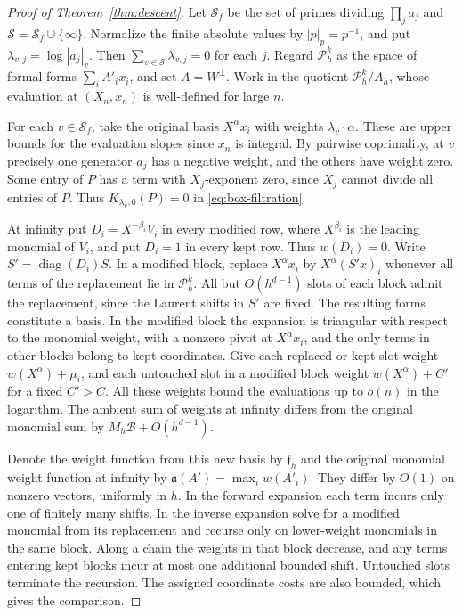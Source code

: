 \documentclass[11pt,a4paper,reqno]{amsart}
\theoremstyle{definition}
\theoremstyle{remark}
\numberwithin{equation}{section}
\begin{document}
\begin{proof}[Proof of Theorem~\ref{thm:descent}]
Let \(\mathcal S_f\) be the set of primes dividing \(\prod_j a_j\)
and \(\mathcal S=\mathcal S_f\cup\{\infty\}\). Normalize the finite
absolute values by \(|p|_p=p^{-1}\), and put
\(\lambda_{v,j}=\log|a_j|_v\). Then
\(\sum_{v\in\mathcal S}\lambda_{v,j}=0\) for each \(j\).
Regard \(\mathcal P_h^k\) as the space of formal forms
\(\sum_i A'_i x_i\), and set \(A=W^\perp\).
Work in the quotient \(\mathcal P_h^k/A_h\), whose evaluation
at \((X_n,x_n)\) is well-defined for large \(n\).

For each \(v\in\mathcal S_f\), take the original basis
\(X^\alpha x_i\) with weights \(\lambda_v\cdot\alpha\).
These are upper bounds for the evaluation slopes since \(x_n\)
is integral. By pairwise coprimality, at \(v\) precisely one generator
\(a_j\) has a negative weight, and the others have weight zero.
Some entry of \(P\) has a term with \(X_j\)-exponent zero,
since \(X_j\) cannot divide all entries of \(P\).
Thus \(K_{\lambda_v,0}(P)=0\) in \eqref{eq:box-filtration}.

At infinity put \(D_i=X^{-\beta_i}V_i\) in every modified row,
where \(X^{\beta_i}\) is the leading monomial of \(V_i\), and put
\(D_i=1\) in every kept row. Thus \(w(D_i)=0\).
Write \(S'=\operatorname{diag}(D_i)S\).
In a modified block, replace \(X^\alpha x_i\) by \(X^\alpha(S'x)_i\)
whenever all terms of the replacement lie in \(\mathcal P_h^k\).
All but \(O(h^{d-1})\) slots of each block admit the replacement,
since the Laurent shifts in \(S'\) are fixed. The resulting forms
constitute a basis. In the modified block the expansion is
triangular with respect to the monomial weight, with a nonzero
pivot at \(X^\alpha x_i\), and the only terms in other blocks
belong to kept coordinates. Give each replaced or kept slot
weight \(w(X^\alpha)+\mu_i\), and each untouched slot in a modified
block weight \(w(X^\alpha)+C'\) for a fixed \(C'>C\).
All these weights bound the evaluations up to \(o(n)\) in the
logarithm. The ambient sum of weights at infinity differs from the
original monomial sum by \(M_h\mathcal B+O(h^{d-1})\).

Denote the weight function from this new basis by \(\mathfrak f_h\)
and the original monomial weight function at infinity by
\(\mathfrak a(A')=\max_i w(A'_i)\).
They differ by \(O(1)\) on nonzero vectors, uniformly in \(h\).
In the forward expansion each term incurs only one of finitely
many shifts. In the inverse expansion solve for a modified
monomial from its replacement and recurse only on lower-weight
monomials in the same block. Along a chain the weights in that
block decrease, and any terms entering kept blocks incur at most
one additional bounded shift. Untouched slots terminate the
recursion. The assigned coordinate costs are also bounded, which
gives the comparison.


\end{proof}
\end{document}
